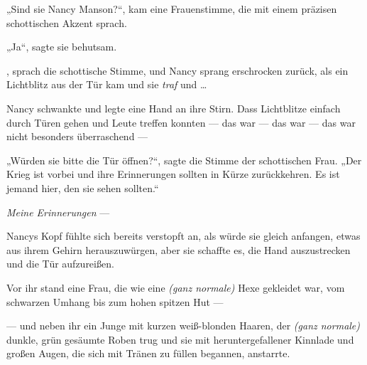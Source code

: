 „Sind sie Nancy Manson?“, kam eine Frauenstimme, die mit einem präzisen schottischen Akzent sprach.

„Ja“, sagte sie behutsam.

, sprach die schottische Stimme, und Nancy sprang erschrocken zurück, als ein Lichtblitz aus der Tür kam und sie \emph{traf} und …

Nancy schwankte und legte eine Hand an ihre Stirn. Dass Lichtblitze einfach durch Türen gehen und Leute treffen konnten — das war — das war — das war nicht besonders überraschend —

„Würden sie bitte die Tür öffnen?“, sagte die Stimme der schottischen Frau.
„Der Krieg ist vorbei und ihre Erinnerungen sollten in Kürze zurückkehren. Es ist jemand hier, den sie sehen sollten.“

\emph{Meine Erinnerungen} —

Nancys Kopf fühlte sich bereits verstopft an, als würde sie gleich anfangen, etwas aus ihrem Gehirn herauszuwürgen, aber sie schaffte es, die Hand auszustrecken und die Tür aufzureißen.

Vor ihr stand eine Frau, die wie eine \emph{(ganz normale)} Hexe gekleidet war, vom schwarzen Umhang bis zum hohen spitzen Hut —

— und neben ihr ein Junge mit kurzen weiß-blonden Haaren, der \emph{(ganz normale)} dunkle, grün gesäumte Roben trug und sie mit heruntergefallener Kinnlade und großen Augen, die sich mit Tränen zu füllen begannen, anstarrte.

